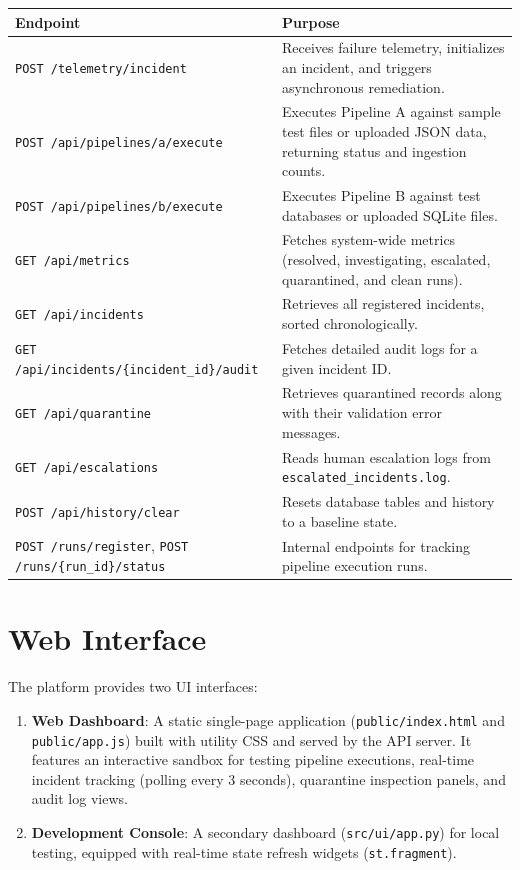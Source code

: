 \documentclass[11pt]{article}
\newcommand{\code}[1]{\texttt{\small #1}}
\begin{document}
\begin{center}
\small
\begin{tabularx}{\textwidth}{@{}l X@{}}
\toprule
\textbf{Endpoint} & \textbf{Purpose} \\
\midrule
\code{POST /telemetry/incident} & Receives failure telemetry, initializes an incident, and triggers asynchronous remediation. \\
\code{POST /api/pipelines/a/execute} & Executes Pipeline A against sample test files or uploaded JSON data, returning status and ingestion counts. \\
\code{POST /api/pipelines/b/execute} & Executes Pipeline B against test databases or uploaded SQLite files. \\
\code{GET /api/metrics} & Fetches system-wide metrics (resolved, investigating, escalated, quarantined, and clean runs). \\
\code{GET /api/incidents} & Retrieves all registered incidents, sorted chronologically. \\
\code{GET /api/incidents/\{incident\_id\}/audit} & Fetches detailed audit logs for a given incident ID. \\
\code{GET /api/quarantine} & Retrieves quarantined records along with their validation error messages. \\
\code{GET /api/escalations} & Reads human escalation logs from \code{escalated\_incidents.log}. \\
\code{POST /api/history/clear} & Resets database tables and history to a baseline state. \\
\code{POST /runs/register}, \code{POST /runs/\{run\_id\}/status} & Internal endpoints for tracking pipeline execution runs. \\
\bottomrule
\end{tabularx}
\end{center}

\section{Web Interface}
The platform provides two UI interfaces:
\begin{enumerate}
  \item \textbf{Web Dashboard}: A static single-page application (\code{public/index.html} and \code{public/app.js}) built with utility CSS and served by the API server. It features an interactive sandbox for testing pipeline executions, real-time incident tracking (polling every 3 seconds), quarantine inspection panels, and audit log views.
  \item \textbf{Development Console}: A secondary dashboard (\code{src/ui/app.py}) for local testing, equipped with real-time state refresh widgets (\code{st.fragment}).
\end{enumerate}
\end{document}
